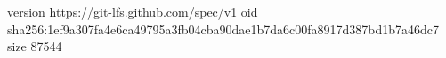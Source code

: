 version https://git-lfs.github.com/spec/v1
oid sha256:1ef9a307fa4e6ca49795a3fb04cba90dae1b7da6c00fa8917d387bd1b7a46dc7
size 87544
